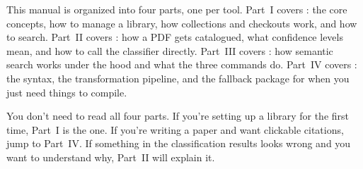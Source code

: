 This manual is organized into four parts, one per tool. Part~I covers
: the core concepts, how to manage a library, how collections
and checkouts work, and how to search. Part~II covers :
how a PDF gets catalogued, what confidence levels mean, and how to call the
classifier directly. Part~III covers : how semantic search
works under the hood and what the three commands do. Part~IV covers
: the  syntax, the
transformation pipeline, and the fallback package for when you just need
things to compile.

You don't need to read all four parts. If you're setting up a library for
the first time, Part~I is the one. If you're writing a paper and want
clickable citations, jump to Part~IV. If something in the classification
results looks wrong and you want to understand why, Part~II will explain it.
